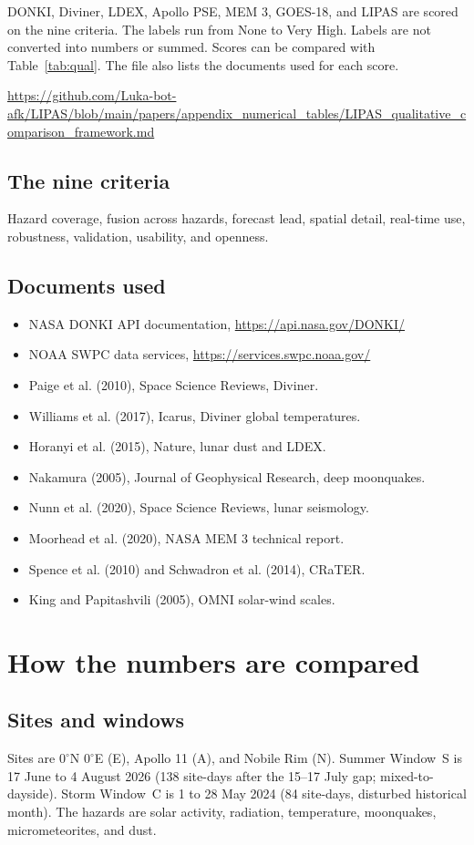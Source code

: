 DONKI, Diviner, LDEX, Apollo PSE, MEM 3, GOES-18, and LIPAS are scored on the nine criteria. The labels run from None to Very High. Labels are not converted into numbers or summed. Scores can be compared with Table~\ref{tab:qual}. The file also lists the documents used for each score.

\url{https://github.com/Luka-bot-afk/LIPAS/blob/main/papers/appendix_numerical_tables/LIPAS_qualitative_comparison_framework.md}

\subsection*{The nine criteria}
Hazard coverage, fusion across hazards, forecast lead, spatial detail, real-time use, robustness, validation, usability, and openness.

\subsection*{Documents used}
\begin{itemize}
\item NASA DONKI API documentation, \url{https://api.nasa.gov/DONKI/}
\item NOAA SWPC data services, \url{https://services.swpc.noaa.gov/}
\item Paige et al. (2010), Space Science Reviews, Diviner.
\item Williams et al. (2017), Icarus, Diviner global temperatures.
\item Horanyi et al. (2015), Nature, lunar dust and LDEX.
\item Nakamura (2005), Journal of Geophysical Research, deep moonquakes.
\item Nunn et al. (2020), Space Science Reviews, lunar seismology.
\item Moorhead et al. (2020), NASA MEM 3 technical report.
\item Spence et al. (2010) and Schwadron et al. (2014), CRaTER.
\item King and Papitashvili (2005), OMNI solar-wind scales.
\end{itemize}

\section{How the numbers are compared}

\subsection*{Sites and windows}
Sites are $0^{\circ}$N $0^{\circ}$E (E), Apollo 11 (A), and Nobile Rim (N). Summer Window~S is 17 June to 4 August 2026 (138 site-days after the 15--17 July gap; mixed-to-dayside). Storm Window~C is 1 to 28 May 2024 (84 site-days, disturbed historical month). The hazards are solar activity, radiation, temperature, moonquakes, micrometeorites, and dust.

